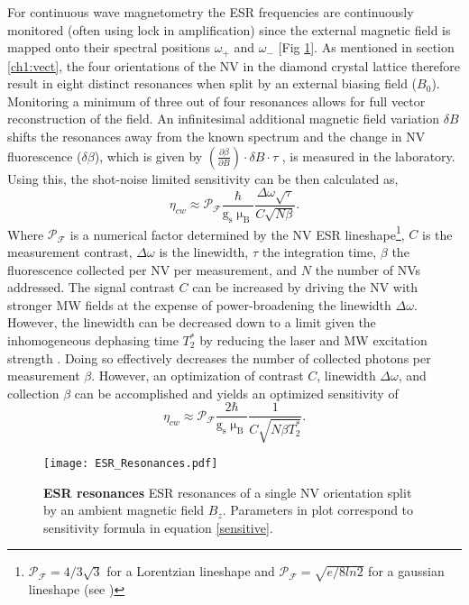For continuous wave magnetometry the ESR frequencies are continuously monitored (often using lock in amplification) since the external magnetic field is mapped onto their spectral positions $\omega_+$ and $\omega_-$ [Fig \ref{ESRfreq}]. As mentioned in section \ref{ch1:vect}, the four orientations of the NV in the diamond crystal lattice therefore result in eight distinct resonances when split by an external biasing field ($B_0$). Monitoring a minimum of three out of four resonances allows for full vector reconstruction of the field. An infinitesimal additional magnetic field variation $\delta B$ shifts the resonances away from the known spectrum and the change in NV fluorescence ($\delta \beta$), which is given by $\left(\frac{\partial \beta}{\partial B}\right) \cdot \delta B \cdot \tau$ \cite{rondin2014magnetometry}, is measured in the laboratory. Using this, the shot-noise limited sensitivity can be then calculated as,
\begin{equation} \label{sensitive}
\eta_{cw} \approx \mathcal{P}_\mathcal{F}\frac{\hbar}{\text{g}_\text{s} \upmu_\text{B}} \frac{\Delta \omega \sqrt{\tau}}{C\sqrt{N \beta}}. 
\end{equation}
Where $\mathcal{P}_{\mathcal{F}}$ is a numerical factor determined by the NV ESR lineshape\footnote{$\mathcal{P}_\mathcal{F} = 4/3\sqrt{3}$ for a Lorentzian lineshape and $\mathcal{P}_\mathcal{F} = \sqrt{e/8ln2}$ for a gaussian lineshape (see \cite{pham2013magnetic})}, $C$ is the measurement contrast, $\Delta \omega$ is the linewidth, $\tau$ the integration time, $\beta$ the fluorescence collected per NV per measurement, and $N$ the number of NVs addressed.
The signal contrast $C$ can be increased by driving the NV with stronger MW fields at the expense of power-broadening the linewidth $\Delta \omega$. However, the linewidth can be decreased down to a limit given the inhomogeneous dephasing time $T_2^*$ by reducing the laser and MW excitation strength \cite{dreau2011avoiding}. Doing so effectively decreases the number of collected photons per measurement $\beta$. However, an optimization of contrast $C$, linewidth $\Delta \omega$, and collection $\beta$ can be accomplished and yields an optimized sensitivity of \cite{pham2013magnetic}
\begin{equation}
\eta_{cw} \approx  \mathcal{P}_\mathcal{F}\frac{2\hbar}{\text{g}_\text{s} \upmu_\text{B}} \frac{1}{C\sqrt{N \beta T_2^*}}.
\end{equation}

\begin{figure}[t!]
\centering
\texttt{[image: ESR\_Resonances.pdf]}  
\caption{\textbf{ESR resonances} ESR resonances of a single NV orientation split by an ambient magnetic field $B_z$. Parameters in plot correspond to sensitivity formula in equation \ref{sensitive}.}
\label{ESRfreq}
\end{figure}

